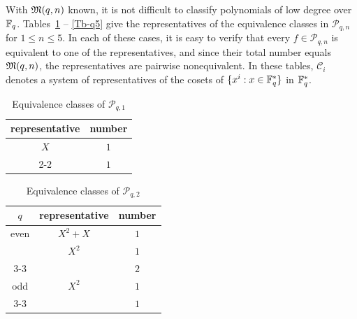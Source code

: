 \documentclass{amsart}
\numberwithin{equation}{section}
\theoremstyle{definition}
\newcommand{\f}{\Bbb F}
\begin{document}
With $\frak M(q,n)$ known, it is not difficult to classify polynomials of low degree over $\f_q$. Tables~\ref{Tb-q1} -- \ref{Tb-q5} give the representatives of the equivalence classes in $\mathcal P_{q,n}$ for $1\le n\le 5$. In each of these cases, it is easy to verify that every $f\in\mathcal P_{q,n}$ is equivalent to one of the representatives, and since their total number equals $\frak M(q,n)$, the representatives are pairwise nonequivalent. In these tables, $\mathcal C_i$ denotes a system of representatives of the cosets of $\{x^i:x\in\f_q^*\}$ in $\f_q^*$. 

\begin{table}[h]
\caption{Equivalence classes of $\mathcal P_{q,1}$}\label{Tb-q1}
   \renewcommand*{\arraystretch}{1.2}
    \centering
     \begin{tabular}{c|c}
     \hline
     	 representative & number \\ \hline      
         $X$ & $1$  \\ \cline{2-2}   
         & $1$  \\
         \hline
    \end{tabular}
\end{table}

\begin{table}[h]
\caption{Equivalence classes of $\mathcal P_{q,2}$}\label{Tb-q2}
   \renewcommand*{\arraystretch}{1.2}
    \centering
     \begin{tabular}{c|c|c}
     \hline
     	$q$ & representative & number \\ \hline      
        even & $X^2+X$ & $1$  \\ 
        & $X^2$ & $1$ \\ \cline{3-3}   
        & & $2$  \\
         \hline
        odd & $X^2$ & $1$  \\ \cline{3-3}   
        & & $1$  \\
         \hline 
    \end{tabular}
\end{table}
\end{document}
